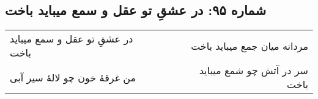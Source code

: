 \begin{center}
\section*{شماره ۹۵: در عشقِ تو عقل و سمع میباید باخت}
\label{sec:095}
\begin{longtable}{l p{0.5cm} r}
در عشقِ تو عقل و سمع میباید باخت
&&
مردانه میان جمع میباید باخت
\\
من غرقهٔ خون چو لالهٔ سیر آبی
&&
سر در آتش چو شمع میباید باخت
\\
\end{longtable}
\end{center}
